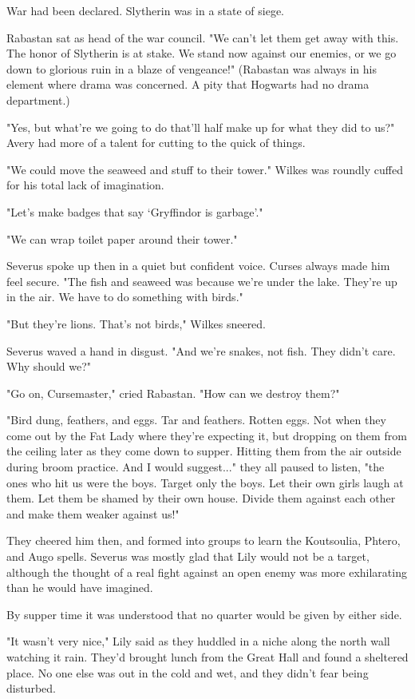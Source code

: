 War had been declared. Slytherin was in a state of siege.

Rabastan sat as head of the war council. "We can't let them get away with this. The honor of Slytherin is at stake. We stand now against our enemies, or we go down to glorious ruin in a blaze of vengeance!" (Rabastan was always in his element where drama was concerned. A pity that Hogwarts had no drama department.)

"Yes, but what're we going to do that'll half make up for what they did to us?" Avery had more of a talent for cutting to the quick of things.

"We could move the seaweed and stuff to their tower." Wilkes was roundly cuffed for his total lack of imagination.

"Let's make badges that say `Gryffindor is garbage'."

"We can wrap toilet paper around their tower."

Severus spoke up then in a quiet but confident voice. Curses always made him feel secure. "The fish and seaweed was because we're under the lake. They're up in the air. We have to do something with birds."

"But they're lions. That's not birds," Wilkes sneered.

Severus waved a hand in disgust. "And we're snakes, not fish. They didn't care. Why should we?"

"Go on, Cursemaster," cried Rabastan. "How can we destroy them?"

"Bird dung, feathers, and eggs. Tar and feathers. Rotten eggs. Not when they come out by the Fat Lady where they're expecting it, but dropping on them from the ceiling later as they come down to supper. Hitting them from the air outside during broom practice. And I would suggest..." they all paused to listen, "the ones who hit us were the boys. Target only the boys. Let their own girls laugh at them. Let them be shamed by their own house. Divide them against each other and make them weaker against us!"

They cheered him then, and formed into groups to learn the Koutsoulia, Phtero, and Augo spells. Severus was mostly glad that Lily would not be a target, although the thought of a real fight against an open enemy was more exhilarating than he would have imagined.

By supper time it was understood that no quarter would be given by either side.

"It wasn't very nice," Lily said as they huddled in a niche along the north wall watching it rain. They'd brought lunch from the Great Hall and found a sheltered place. No one else was out in the cold and wet, and they didn't fear being disturbed.

